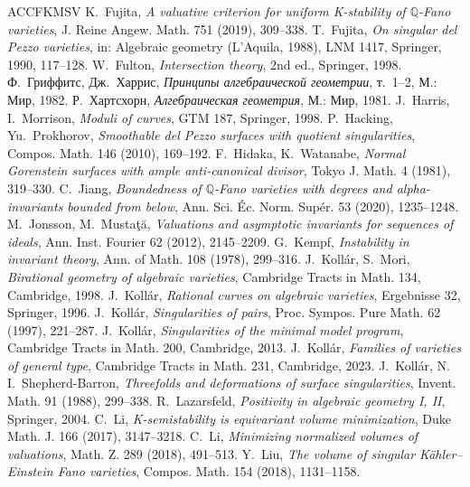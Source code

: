 \documentclass[11pt,a4paper]{article}
\theoremstyle{plain}
\theoremstyle{definition}
\theoremstyle{remark}
\newcommand{\Q}{\mathbb{Q}}
\begin{document}
\begin{thebibliography}{ACCFKMSV}
 K.~Fujita, \emph{A valuative criterion for uniform K-stability of $\Q$-Fano varieties}, J. Reine Angew. Math. 751 (2019), 309--338.
 T.~Fujita, \emph{On singular del Pezzo varieties}, in: Algebraic geometry (L'Aquila, 1988), LNM 1417, Springer, 1990, 117--128.
 W.~Fulton, \emph{Intersection theory}, 2nd ed., Springer, 1998.
 Ф.~Гриффитс, Дж.~Харрис, \emph{Принципы алгебраической геометрии}, т.~1--2, М.: Мир, 1982.
 Р.~Хартсхорн, \emph{Алгебраическая геометрия}, М.: Мир, 1981.
 J.~Harris, I.~Morrison, \emph{Moduli of curves}, GTM 187, Springer, 1998.
 P.~Hacking, Yu.~Prokhorov, \emph{Smoothable del Pezzo surfaces with quotient singularities}, Compos. Math. 146 (2010), 169--192.
 F.~Hidaka, K.~Watanabe, \emph{Normal Gorenstein surfaces with ample anti-canonical divisor}, Tokyo J. Math. 4 (1981), 319--330.
 C.~Jiang, \emph{Boundedness of $\Q$-Fano varieties with degrees and alpha-invariants bounded from below}, Ann. Sci. \'Ec. Norm. Sup\'er. 53 (2020), 1235--1248.
 M.~Jonsson, M.~Musta\c t\u a, \emph{Valuations and asymptotic invariants for sequences of ideals}, Ann. Inst. Fourier 62 (2012), 2145--2209.
 G.~Kempf, \emph{Instability in invariant theory}, Ann. of Math. 108 (1978), 299--316.
 J.~Koll\'ar, S.~Mori, \emph{Birational geometry of algebraic varieties}, Cambridge Tracts in Math. 134, Cambridge, 1998.
 J.~Koll\'ar, \emph{Rational curves on algebraic varieties}, Ergebnisse 32, Springer, 1996.
 J.~Koll\'ar, \emph{Singularities of pairs}, Proc. Sympos. Pure Math. 62 (1997), 221--287.
 J.~Koll\'ar, \emph{Singularities of the minimal model program}, Cambridge Tracts in Math. 200, Cambridge, 2013.
 J.~Koll\'ar, \emph{Families of varieties of general type}, Cambridge Tracts in Math. 231, Cambridge, 2023.
 J.~Koll\'ar, N.\,I.~Shepherd-Barron, \emph{Threefolds and deformations of surface singularities}, Invent. Math. 91 (1988), 299--338.
 R.~Lazarsfeld, \emph{Positivity in algebraic geometry I, II}, Springer, 2004.
 C.~Li, \emph{K-semistability is equivariant volume minimization}, Duke Math. J. 166 (2017), 3147--3218.
 C.~Li, \emph{Minimizing normalized volumes of valuations}, Math. Z. 289 (2018), 491--513.
 Y.~Liu, \emph{The volume of singular K\"ahler--Einstein Fano varieties}, Compos. Math. 154 (2018), 1131--1158.

\end{thebibliography}
\end{document}
